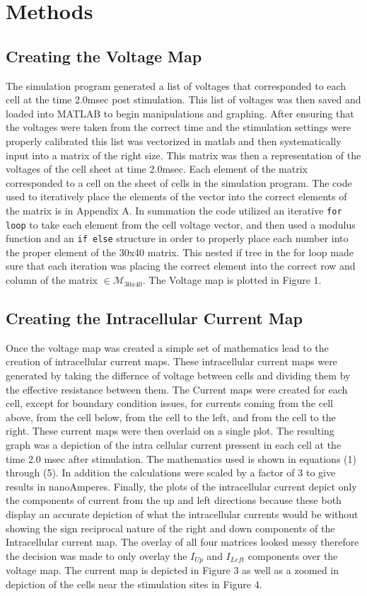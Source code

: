 \documentclass[10pt, titlepage]{article}
\begin{document}
\section{Methods}
\subsection{Creating the Voltage Map}
The simulation program generated a list of voltages that corresponded to each cell at the time 2.0msec post stimulation. This list of voltages was then saved and loaded into MATLAB to begin manipulations and graphing. After ensuring that the voltages were taken from the correct time and the stimulation settings were properly calibrated this list was vectorized in matlab and then systematically input into a matrix of the right size. This matrix was then a representation of the voltages of the cell sheet at time 2.0msec. Each element of the matrix corresponded to a cell on the sheet of cells in the simulation program. The code used to iteratively place the elements of the vector into the correct elements of the matrix is in Appendix A. In summation the code utilized an iterative {\tt for loop} to take each element from the cell voltage vector, and then used a modulus function and an {\tt if else} structure in order to properly place each number into the proper element of the 30x40 matrix. This nested if tree in the for loop made sure that each iteration was placing the correct element into the correct row and column of the matrix $\in \mathcal{M}_{30x40}$. The Voltage map is plotted in Figure 1.

\subsection{Creating the Intracellular Current Map}
Once the voltage map was created a simple set of mathematics lead to the creation of intracellular current maps. These intracellular current maps were generated by taking the differnce of voltage between cells and dividing them by the effective resistance between them. The Current maps were created for each cell, except for boundary condition issues, for currents coming from the cell above, from the cell below, from the cell to the left, and from the cell to the right. These current maps were then overlaid on a single plot. The resulting graph was a depiction of the intra cellular current pressent in each cell at the time 2.0 msec after stimulation. The mathematics used is shown in equations (1) through (5). In addition the calculations were scaled by a factor of 3 to give results in nanoAmperes. Finally, the plots of the intracellular current depict only the components of current from the up and left directions because these both display an accurate depiction of what the intracellular currents would be without showing the sign reciprocal nature of the right and down components of the Intracellular current map. The overlay of all four matrices looked messy therefore the decision was made to only overlay the $I_{Up}$ and $I_{Left}$ components over the voltage map. The current map is depicted in Figure 3 as well as a zoomed in depiction of the cells near the stimulation sites in Figure 4.
\end{document}
